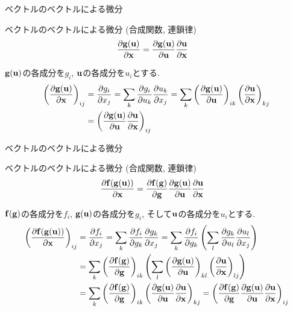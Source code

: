 \documentclass[dvipdfmx,notheorems,t]{beamer}
\begin{document}
\begin{frame}{ベクトルのベクトルによる微分}
\begin{block}{ベクトルのベクトルによる微分 (合成関数, 連鎖律)}
  \begin{align*}
    \pdv{\vb{g}(\vb{u})}{\vb{x}} &= \pdv{\vb{g}(\vb{u})}{\vb{u}} \pdv{\vb{u}}{\vb{x}}
  \end{align*}
\end{block}

$\vb{g}(\vb{u})$の各成分を$g_i$, $\vb{u}$の各成分を$u_i$とする.
\begin{align*}
  \left( \pdv{\vb{g}(\vb{u})}{\vb{x}} \right)_{ij} &= \pdv{g_i}{x_j}
    = \sum_k \pdv{g_i}{u_k} \pdv{u_k}{x_j}
    = \sum_k \left( \pdv{\vb{g}(\vb{u})}{\vb{u}} \right)_{ik} \left( \pdv{\vb{u}}{\vb{x}} \right)_{kj} \\
    &= \left( \pdv{\vb{g}(\vb{u})}{\vb{u}} \pdv{\vb{u}}{\vb{x}} \right)_{ij}
\end{align*}
\end{frame}

\begin{frame}{ベクトルのベクトルによる微分}
\begin{block}{ベクトルのベクトルによる微分 (合成関数, 連鎖律)}
  \begin{align*}
    \pdv{\vb{f}(\vb{g}(\vb{u}))}{\vb{x}}
      &= \pdv{\vb{f}(\vb{g})}{\vb{g}} \pdv{\vb{g}(\vb{u})}{\vb{u}} \pdv{\vb{u}}{\vb{x}}
  \end{align*}
\end{block}

$\vb{f}(\vb{g})$の各成分を$f_i$, $\vb{g}(\vb{u})$の各成分を$g_i$, そして$\vb{u}$の各成分を$u_i$とする.
\begin{align*}
  \left( \pdv{\vb{f}(\vb{g}(\vb{u}))}{\vb{x}} \right)_{ij} &= \pdv{f_i}{x_j}
    = \sum_k \pdv{f_i}{g_k} \pdv{g_k}{x_j}
    = \sum_k \pdv{f_i}{g_k} \left( \sum_l \pdv{g_k}{u_l} \pdv{u_l}{x_j} \right) \\
    &= \sum_k \left( \pdv{\vb{f}(\vb{g})}{\vb{g}} \right)_{ik}
      \left( \sum_l \left( \pdv{\vb{g}(\vb{u})}{\vb{u}} \right)_{kl}
        \left( \pdv{\vb{u}}{\vb{x}} \right)_{lj} \right) \\
    &= \sum_k \left( \pdv{\vb{f}(\vb{g})}{\vb{g}} \right)_{ik}
      \left( \pdv{\vb{g}(\vb{u})}{\vb{u}} \pdv{\vb{u}}{\vb{x}} \right)_{kj}
    = \left( \pdv{\vb{f}(\vb{g})}{\vb{g}} \pdv{\vb{g}(\vb{u})}{\vb{u}} \pdv{\vb{u}}{\vb{x}} \right)_{ij}
\end{align*}
\end{frame}
\end{document}
